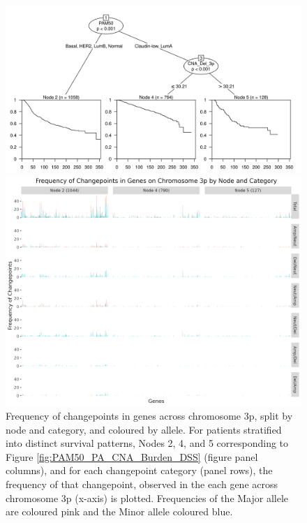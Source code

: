 \begin{figure}[!hp]
\centering

\includegraphics[width=1\textwidth]{../figures/Chapter_3/PA_Ctree_Survival_Burden_DSS_PAM50.png}

\vspace{0.5cm}

\includegraphics[width = 1\textwidth]{../figures/Chapter_6/Chromosome_3p_Barplot_Node.png}
\caption[Frequency of changepoints in genes across chromosome 3p, split by node and category, and coloured by allele.]{Frequency of changepoints in genes across chromosome 3p, split by node and category, and coloured by allele. For patients stratified into distinct survival patterns, Nodes 2, 4, and 5 corresponding to Figure \ref{fig:PAM50_PA_CNA_Burden_DSS} (figure panel columns), and for each changepoint category (panel rows), the frequency of that changepoint, observed in the each gene across chromosome 3p (x-axis) is plotted. Frequencies of the Major allele are coloured pink and the Minor allele coloured blue.}
\label{fig:Barplot_3p}
\end{figure}


